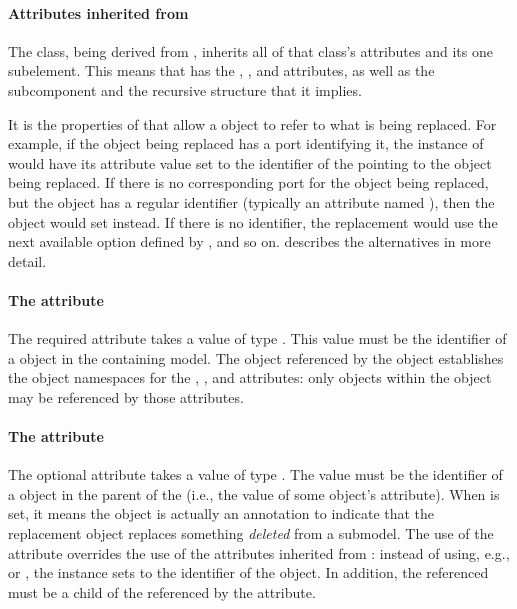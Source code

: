 \paragraph{Attributes inherited from }

The \ReplacedElement class, being derived from \SBaseRef, inherits all of that class's attributes and its one subelement.  This means that \ReplacedElement has the , ,  and  attributes, as well as the subcomponent  and the recursive structure that it implies.

It is the properties of \SBaseRef that allow a \ReplacedElement object to refer to what is being replaced.  For example, if the object being replaced has a port identifying it, the instance of \ReplacedElement would have its  attribute value set to the identifier of the \Port pointing to the object being replaced.  If there is no corresponding port for the object being replaced, but the object has a regular identifier (typically an attribute named ), then the \ReplacedElement object would set  instead.  If there is no identifier, the replacement would use the next available option defined by \SBaseRef, and so on.   describes the alternatives in more detail.


\paragraph{The \fixttspace{} attribute}
\label{replacedelement-submodelref}

The required attribute  takes a value of type .  This value must be the identifier of a \Submodel object in the containing model.  The \Model object referenced by the \Submodel object establishes the object namespaces for the , ,  and  attributes: only objects within the \Model object may be referenced by those attributes.


\paragraph{The \fixttspace{} attribute}
\label{replacedelement-deletion}

The optional attribute  takes a value of type .  The value must be the identifier of a \Deletion object in the parent \Model of the \ReplacedElement (i.e., the value of some \Deletion object's  attribute).  When  is set, it means the \ReplacedElement object is actually an annotation to indicate that the replacement object replaces something \emph{deleted} from a submodel.  The use of the  attribute overrides the use of the attributes inherited from \SBaseRef: instead of using, e.g.,  or , the \ReplacedElement instance sets  to the identifier of the \Deletion object.  In addition, the referenced \Deletion must be a child of the \Submodel referenced by the  attribute.

